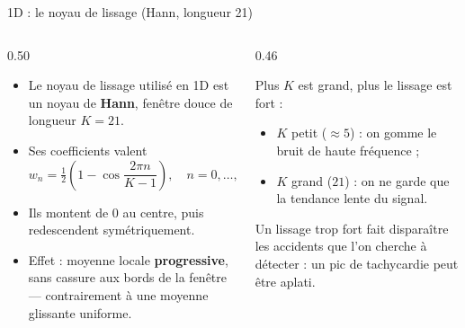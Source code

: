 \begin{frame}{1D : le noyau de lissage (Hann, longueur 21)}
\begin{columns}[t]
\begin{column}{0.50\textwidth}
\begin{itemize}
  \item Le noyau de lissage utilisé en 1D est un noyau de \textbf{Hann},
  fenêtre douce de longueur $K = 21$.
  \item Ses coefficients valent
  \[
  w_n = \tfrac{1}{2}\left(1 - \cos\frac{2\pi n}{K-1}\right),
  \quad n = 0,\dots,K-1
  \]
  \item Ils montent de $0$ au centre, puis redescendent symétriquement.
  \item Effet : moyenne locale \textbf{progressive}, sans cassure aux bords
  de la fenêtre --- contrairement à une moyenne glissante uniforme.
\end{itemize}
\end{column}
\begin{column}{0.46\textwidth}
\begin{ebox}
Plus $K$ est grand, plus le lissage est fort :
\begin{itemize}
  \item $K$ petit ($\approx 5$) : on gomme le bruit de haute fréquence ;
  \item $K$ grand ($21$) : on ne garde que la tendance lente du signal.
\end{itemize}
\end{ebox}
\begin{wbox}[Compromis]
Un lissage trop fort fait disparaître les accidents que l'on cherche à
détecter : un pic de tachycardie peut être aplati.
\end{wbox}
\end{column}
\end{columns}
\end{frame}

